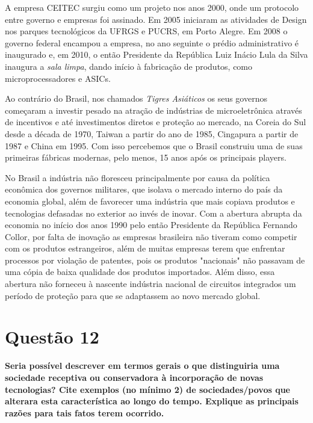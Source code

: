 A empresa CEITEC surgiu como um projeto nos anos 2000, onde um protocolo entre governo e empresas foi assinado. Em 2005 iniciaram as atividades de Design nos parques tecnológicos da UFRGS e PUCRS, em Porto Alegre. Em 2008 o governo federal encampou a empresa, no ano seguinte o prédio administrativo é inaugurado e, em 2010, o então Presidente da República Luiz Inácio Lula da Silva inaugura a \textit{sala limpa}, dando início à fabricação de produtos, como microprocessadores e ASICs.

Ao contrário do Brasil, nos chamados \textit{Tigres Asiáticos} os seus governos começaram a investir pesado na atração de indústrias de microeletrônica através de incentivos e até investimentos diretos e proteção ao mercado, na Coreia do Sul desde a década de 1970, Taiwan a partir do ano de 1985, Cingapura a partir de 1987 e China em 1995. Com isso percebemos que o Brasil construiu uma de suas primeiras fábricas modernas, pelo menos, 15 anos após os principais players.

No Brasil a indústria não floresceu principalmente por causa da política econômica dos governos militares, que isolava o mercado interno do país da economia global, além de favorecer uma indústria que mais copiava produtos e tecnologias defasadas no exterior ao invés de inovar. Com a abertura abrupta da economia no início dos anos 1990 pelo então Presidente da República Fernando Collor, por falta de inovação as empresas brasileira não tiveram como competir com os produtos estrangeiros, além de muitas empresas terem que enfrentar processos por violação de patentes, pois os produtos "nacionais" não passavam de uma cópia de baixa qualidade dos produtos importados. Além disso, essa abertura não forneceu à nascente indústria nacional de circuitos integrados um período de proteção para que se adaptassem ao novo mercado global. 


\section{Questão 12}
\label{sec:q12}
\textbf{Seria possível descrever em termos gerais o que distinguiria uma sociedade receptiva ou conservadora à incorporação de novas tecnologias? Cite exemplos (no mínimo 2) de sociedades/povos que alterara esta característica ao longo do tempo. Explique as principais razões para tais fatos terem ocorrido.} \\

